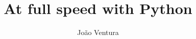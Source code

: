 \documentclass[12pt, a4paper, oneside]{book}
\begin{document}
\title{At full speed with Python}
\author{João Ventura}
\date{}

\maketitle

{
	\setcounter{tocdepth}{2}
	\tableofcontents
}








\end{document}
